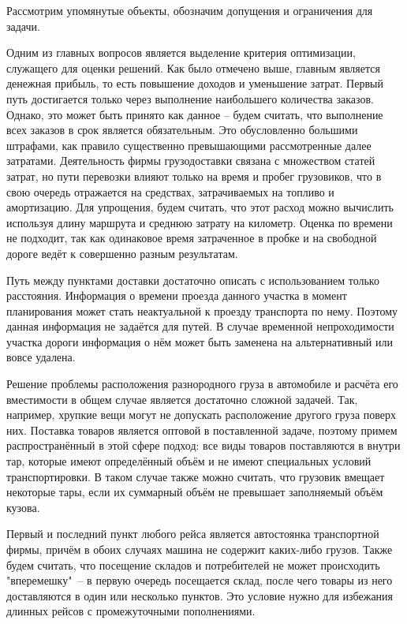 	Рассмотрим упомянутые объекты, обозначим допущения и ограничения для задачи.
	
	Одним из главных вопросов является выделение критерия оптимизации, служащего для оценки решений. Как было отмечено выше, главным является денежная прибыль, то есть повышение доходов и уменьшение затрат.   
	Первый путь достигается только через выполнение наибольшего количества заказов. Однако, это может быть принято как данное -- будем считать, что выполнение всех заказов в срок является обязательным. Это обусловленно большими штрафами, как правило существенно превышающими рассмотренные далее затратами.   
	Деятельность фирмы грузодоставки связана с множеством статей затрат, но пути перевозки влияют только на время и пробег грузовиков, что в свою очередь отражается на средствах, затрачиваемых на топливо и амортизацию. Для упрощения, будем считать, что этот расход можно вычислить используя длину маршрута и среднюю затрату на километр. Оценка по времени не подходит, так как одинаковое время затраченное в пробке и на свободной дороге ведёт к совершенно разным результатам.
	
	Путь между пунктами доставки достаточно описать с использованием только расстояния. Информация о времени проезда данного участка в момент планирования может стать неактуальной к проезду транспорта по нему. Поэтому данная информация не задаётся для путей. В случае временной непроходимости участка дороги информация о нём может быть заменена на альтернативный или вовсе удалена.
	
	Решение проблемы расположения разнородного груза в автомобиле и расчёта его вместимости в общем случае является достаточно сложной задачей. Так, например, хрупкие вещи могут не допускать расположение другого груза поверх них. Поставка товаров является оптовой в поставленной задаче, поэтому примем распространённый в этой сфере подход: все виды товаров поставляются в внутри тар, которые имеют определённый объём и не имеют специальных условий транспортировки. В таком случае также можно считать, что грузовик вмещает некоторые тары, если их суммарный объём не превышает заполняемый объём кузова.
	
	Первый и последний пункт любого рейса является автостоянка транспортной фирмы, причём в обоих случаях машина не содержит каких-либо грузов. Также будем считать, что посещение складов и потребителей не может происходить "вперемешку"\ -- в первую очередь посещается склад, после чего товары из него доставляются в один или несколько пунктов. Это условие нужно для избежания длинных рейсов с промежуточными пополнениями.

